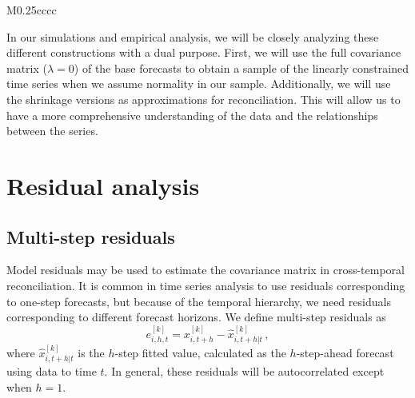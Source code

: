 \documentclass[a4paper,11pt]{article}
\theoremstyle{definition}
\begin{document}
\begin{table}[!htb]
\begin{tabular}{M{0.25\linewidth}cccc}
	\end{tabular}
	\endgroup
	\caption{Number of different parameters that need to be estimated for the Monte Carlo simulation (\textbf{AR(2)}, see \autoref{sec:mcsim}), the Australian GDP (\textbf{AusGDP}, see \autoref{sec:ausgdp}) dataset and the Australian Tourism Demand (\textbf{VN525}, see \autoref{sec:vn525}): the first one has $3$ time series (one upper and two bottom) with temporal aggregation $\mathcal{K} = \{2, 1\}$; the second one has $95$ quarterly ($m = 4$ and $k^\ast = 3$) time series ($62$ free and $33$ constraints, see \citealp{giro2022}); the last one has a total of 525 monthly ($m = 12$ and $k^\ast = 16$) time series ($304$ bottom and $221$ upper).}
	\label{tab:num_param_data}
\end{table}

In our simulations and empirical analysis, we will be closely analyzing these different constructions with a dual purpose. First, we will use the full covariance matrix ($\lambda = 0$) of the base forecasts to obtain a sample of the linearly constrained time series when we assume normality in our sample. Additionally, we will use the shrinkage versions as approximations for reconciliation. This will allow us to have a more comprehensive understanding of the data and the relationships between the series.

\section{Residual analysis}\label{sec:res}

\subsection{Multi-step residuals} \label{ssec:multi_res}

Model residuals may be used to estimate the covariance matrix in cross-temporal reconciliation. It is common in time series analysis to use residuals corresponding to one-step forecasts, but because of the temporal hierarchy, we need residuals corresponding to different forecast horizons. We define multi-step residuals as
$$
	e_{i,h,t}^{[k]} = x_{i,t+h}^{[k]} - \widehat{x}_{i,t+h|t}^{[k]}\,, %
$$
where $\widehat{x}_{i,t+h|t}^{[k]}$ is the $h$-step fitted value, calculated as the $h$-step-ahead forecast using data to time $t$. In general, these residuals will be autocorrelated except when $h=1$.
\end{document}

